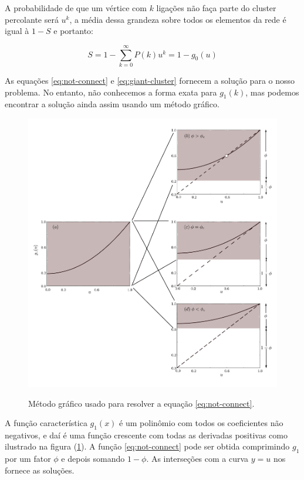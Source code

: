 \documentclass[a4paper,11pt]{report}
\begin{document}
A probabilidade de que um  v\'ertice com $k$ liga\c{c}\~oes n\~ao fa\c{c}a parte do cluster percolante ser\'a $u^k$, a m\'edia dessa grandeza sobre todos os elementos da rede \'e igual \`a $1-S$ e portanto:

\begin{equation}
S=1-\sum_{k=0}^{\infty}P(k)u^k=1-g_0(u)
\label{eq:giant-cluster}
\end{equation}

As equa\c{c}\~oes \ref{eq:not-connect} e \ref{eq:giant-cluster} fornecem a solu\c{c}\~ao para o nosso problema. No entanto, n\~ao conhecemos a forma exata para $g_1(k)$, mas podemos encontrar a solu\c{c}\~ao ainda assim usando um m\'etodo gr\'afico. 

\begin{figure}[ht!]
\begin{center}
\includegraphics[scale=0.35]{./images/plot-geratriz.pdf}
\label{fig:plot-geratriz}
\caption{M\'etodo gr\'afico usado para resolver a equa\c{c}\~ao \ref{eq:not-connect}.}
\end{center}
\end{figure}

A fun\c{c}\~ao caracter\'istica $g_1(x)$ \'e um polin\^omio com todos os coeficientes n\~ao negativos, e da\'i \'e uma fun\c{c}\~ao crescente com todas as derivadas positivas como ilustrado na figura (\ref{fig:plot-geratriz}). A fun\c{c}\~ao \ref{eq:not-connect} pode ser obtida comprimindo $g_1$ por um fator $\phi$ e depois somando $1-\phi$. As interse\c{c}\~oes com a curva $y=u$ nos fornece as solu\c{c}\~oes. 
\end{document}

